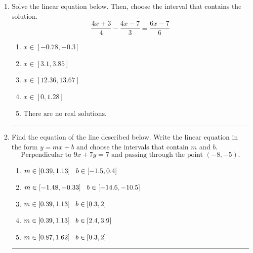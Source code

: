 \documentclass[14pt]{extbook}
\newcommand{\litem}[1]{\item#1\hspace*{-1cm}\rule{\textwidth}{0.4pt}}
\begin{document}
\begin{enumerate}
\litem{
Solve the linear equation below. Then, choose the interval that contains the solution.\[ \frac{4x + 3}{4} - \frac{4x -7}{3} = \frac{6x -7}{6} \]\begin{enumerate}[label=\Alph*.]
\item \( x \in [-0.78, -0.3] \)
\item \( x \in [3.1, 3.85] \)
\item \( x \in [12.36, 13.67] \)
\item \( x \in [0, 1.28] \)
\item \( \text{There are no real solutions.} \)

\end{enumerate} }
\litem{
Find the equation of the line described below. Write the linear equation in the form $ y=mx+b $ and choose the intervals that contain $m$ and $b$.\[ \text{Perpendicular to } 9 x + 7 y = 7 \text{ and passing through the point } (-8, -5). \]\begin{enumerate}[label=\Alph*.]
\item \( m \in [0.39, 1.13] \hspace*{3mm} b \in [-1.5, 0.4] \)
\item \( m \in [-1.48, -0.33] \hspace*{3mm} b \in [-14.6, -10.5] \)
\item \( m \in [0.39, 1.13] \hspace*{3mm} b \in [0.3, 2] \)
\item \( m \in [0.39, 1.13] \hspace*{3mm} b \in [2.4, 3.9] \)
\item \( m \in [0.87, 1.62] \hspace*{3mm} b \in [0.3, 2] \)


\end{enumerate}}
\end{enumerate}
\end{document}

